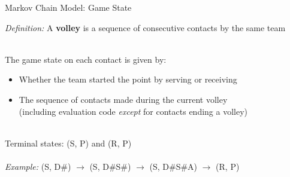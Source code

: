 \documentclass[handout]{beamer}
\begin{document}
\begin{frame}{Markov Chain Model: Game State}
  \begin{tcolorbox}
    {\it Definition:} A {\bf volley} is a sequence of consecutive contacts by the same team
  \end{tcolorbox}
  ~\\
  The game state on each contact is given by:
  \begin{itemize}
    \item Whether the team started the point by serving or receiving
    \item The sequence of contacts made during the current volley\\
      (including evaluation code {\it except} for contacts ending a volley)
  \end{itemize}
  ~\\
  Terminal states: (S, P) and (R, P)\\
  ~\\
  {\it Example:} (S, D\#) $\rightarrow$ (S, D\#S\#) $\rightarrow$ (S, D\#S\#A) $\rightarrow$ (R, P)\\
\end{frame}
\end{document}

